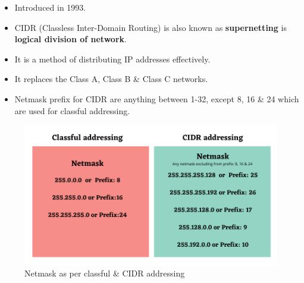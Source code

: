 \setlength{\columnsep}{3pt}
\begin{flushleft}
	\bigskip
	\begin{itemize}
		\item Introduced in 1993.
		\item CIDR (Classless Inter-Domain Routing) is also known as \textbf{supernetting} is \textbf{logical division of network}.
		\item It is a method of distributing IP addresses effectively.
		\item It replaces the Class A, Class B \& Class C networks.
		\item Netmask prefix for CIDR are anything between 1-32, except 8, 16 \& 24 which are used for classful addressing.
	\end{itemize}


\begin{figure}[h!]
	\centering
	\includegraphics[scale=.55]{content/chapter14/images/cidr.png}
	\caption{Netmask as per classful \& CIDR addressing}
	\label{fig:cidr34}
\end{figure}	


	
\end{flushleft}
\newpage


